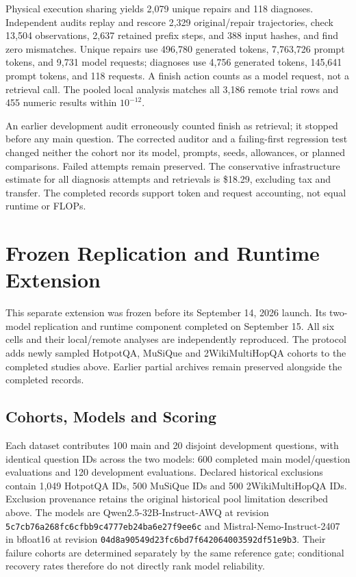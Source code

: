 \documentclass{article}
\begin{document}
Physical execution sharing yields 2,079 unique repairs and 118 diagnoses.
Independent audits replay and rescore 2,329 original/repair trajectories,
check 13,504 observations, 2,637 retained prefix steps, and 388 input hashes,
and find zero mismatches. Unique repairs use 496,780 generated tokens,
7,763,726 prompt tokens, and 9,731 model requests; diagnoses use 4,756
generated tokens, 145,641 prompt tokens, and 118 requests. A finish action
counts as a model request, not a retrieval call. The pooled local analysis
matches all 3,186 remote trial rows and 455 numeric results within $10^{-12}$.

An earlier development audit erroneously counted finish as retrieval; it
stopped before any main question. The corrected auditor and a failing-first
regression test changed neither the cohort nor its model, prompts, seeds,
allowances, or planned comparisons. Failed attempts remain preserved.
The conservative infrastructure estimate for all diagnosis attempts and
retrievals is \$18.29, excluding tax and transfer. The completed records
support token and request accounting, not equal runtime or FLOPs.

\section{Frozen Replication and Runtime Extension}
\label{app:extension_protocol}
This separate extension was frozen before its September 14, 2026 launch.
Its two-model replication and runtime component completed on September 15.
All six cells and their local/remote analyses are independently reproduced. The protocol
adds newly sampled HotpotQA, MuSiQue and 2WikiMultiHopQA cohorts to the
completed studies above. Earlier partial archives remain preserved alongside
the completed records.

\subsection{Cohorts, Models and Scoring}
Each dataset contributes 100 main and 20 disjoint development questions,
with identical question IDs across the two models: 600 completed main
model/question evaluations and 120 development evaluations. Declared
historical exclusions contain 1,049 HotpotQA IDs, 500 MuSiQue IDs and 500
2WikiMultiHopQA IDs. Exclusion provenance retains the original historical
pool limitation described above. The models are Qwen2.5-32B-Instruct-AWQ
at revision \texttt{5c7cb76a268fc6cfbb9c4777eb24ba6e27f9ee6c}
and Mistral-Nemo-Instruct-2407 in bfloat16 at revision
\texttt{04d8a90549d23fc6bd7f642064003592df51e9b3}.
Their failure cohorts are determined separately by the same reference gate;
conditional recovery rates therefore do not directly rank model reliability.
\end{document}
